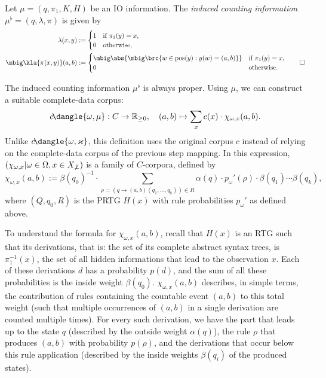 \begin{definition}
 Let $\mu=(q,\pi_1,K,H)$ be an IO information. The \emph{induced counting
 information} $\mu^\flat = (q,\lambda,\pi)$ is given by
 \begin{align*}
  \lambda(x,y) &:= \begin{cases}
   1 & \text{if } \pi_1(y) = x, \\
   0 & \text{otherwise},
  \end{cases} \\
  \mbig\kla{\pi(x,y)}(a,b) &:= \begin{cases}
   \mbig\abs{\mbig\brc{w\in\pos(y): y(w)=(a,b)}} & \text{if } \pi_1(y) = x, \\
   0 & \text{otherwise}.
  \end{cases}
  \qedhere
 \end{align*}
\end{definition}
The induced counting information $\mu^\flat$ is always proper.
\cite[p.~15]{bucstuvog15} Using $\mu$, we can construct a suitable complete-data corpus:
\[
 c\!\dangle{\omega,\mu}: C\to\zr_{\geq0}, \quad
 (a,b) \mapsto \sum_x c(x) \cdot \chi_{\omega,x}(a,b).
\]
Unlike $c\!\dangle{\omega,\varkappa}$, this definition uses the original corpus
$c$ instead of relying on the complete-data corpus of the previous step
mapping. In this expression, $(\chi_{\omega,x}|\omega\in\Omega,x\in
X_{\not\bot})$ is a family of $C$-corpora, defined by
\[
 \chi_{\omega,x}(a,b) := \beta(q_0)^{-1} \cdot \sum_{\rho = (q\to(a,b)(q_1,\ldots,q_k))\in R} \alpha(q) \cdot p_\omega'(\rho) \cdot \beta(q_1) \cdots \beta(q_k),
\]
where $(Q,q_0,R)$ is the PRTG $H(x)$ with rule probabilities $p_\omega'$ as defined above.

To understand the formula for $\chi_{\omega,x}(a,b)$, recall that $H(x)$ is an
RTG such that its derivations, that is: the set of its complete abstract syntax
trees, is $\pi_1^{-1}(x)$, the set of all hidden informations that lead to the
observation $x$. Each of these derivations $d$ has a probability $p(d)$, and
the sum of all these probabilities is the inside weight $\beta(q_0)$.
$\chi_{\omega,x}(a,b)$ describes, in simple terms, the contribution of rules
containing the countable event $(a,b)$ to this total weight (such that
multiple occurrences of $(a,b)$ in a single derivation are counted multiple
times). For every such derivation, we have the part that leads up to the state
$q$ (described by the outside weight $\alpha(q)$), the rule $\rho$ that
produces $(a,b)$ with probability $p(\rho)$, and the derivations that occur
below this rule application (described by the inside weights $\beta(q_i)$ of
the produced states).

